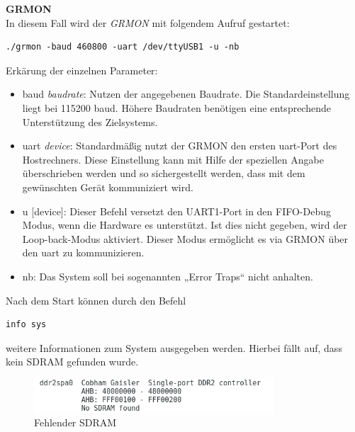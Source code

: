 \newpage
\textbf{GRMON}\\

In diesem Fall wird der \emph{GRMON} mit folgendem Aufruf gestartet:\\



\begin{lstlisting}[caption={Aufruf des GRMON},label={code:grmon}]
./grmon -baud 460800 -uart /dev/ttyUSB1 -u -nb
\end{lstlisting}


\vspace{5mm}
Erkärung der einzelnen Parameter:
\begin{itemize}
  \item baud \emph{baudrate}: Nutzen der angegebenen Baudrate. Die Standardeinstellung liegt bei 115200 baud. Höhere Baudraten benötigen eine entsprechende Unterstützung des Zielsystems.
  \item uart \emph{device}: Standardmäßig nutzt der GRMON den ersten \ac{uart}-Port des Hostrechners. Diese Einstellung kann mit Hilfe der speziellen Angabe überschrieben werden und so sichergestellt werden, dass mit dem gewünschten Gerät kommuniziert wird.
  \item u [device]: Dieser Befehl versetzt den UART1-Port in den FIFO-Debug Modus, wenn die Hardware es unterstützt. Ist dies nicht gegeben, wird der Loop-back-Modus aktiviert. Dieser Modus ermöglicht es via GRMON über den \ac{uart} zu kommunizieren.
  \item nb: Das System soll bei sogenannten „Error Traps“ nicht anhalten.
\end{itemize}
\newpage
Nach dem Start können durch den Befehl\\

\begin{lstlisting}[caption={Abruf von Systeminformationen},label={code:infosys}]
info sys
   \end{lstlisting}

weitere Informationen zum System ausgegeben werden. Hierbei fällt auf, dass kein SDRAM gefunden wurde.\\

\begin{figure}[H]
\centering
\includegraphics[width=0.8\textwidth]{Hauptteil/nosdram.png}
\caption{Fehlender SDRAM}
\label{fig:nosdram}
\end{figure}

